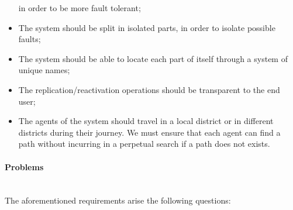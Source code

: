 \begin{itemize}
  in order to be more fault tolerant;
\item The system should be split in isolated parts, in order to isolate
  possible faults;
\item The system should be able to locate each part of itself through a system
  of unique names;
\item The replication/reactivation operations should be transparent to the end
  user;
\item The agents of the system should travel in a local district or in different
districts during their journey. We must ensure that each agent can find a path
without incurring in a perpetual search if a path does not exists.
\end{itemize}

\paragraph{Problems} \mbox{} \\

The aforementioned requirements arise the following questions:

